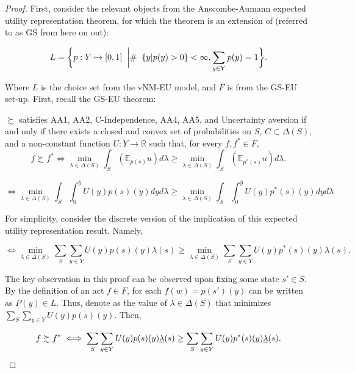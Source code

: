\documentclass[\econtexRoot/IneqMeas]{subfiles}
\begin{document}
\begin{proof}

	\par First, consider the relevant objects from the Anscombe-Aumann expected utility representation theorem, for which the \cite{gs89} theorem is an extension of (referred to as GS from here on out):
	
	$$ L = \bigg\{ p: Y \mapsto [0,1] \hspace{2mm} \bigg| \# \hspace{2mm} \{y|p(y)>0\} < \infty, \sum_{y \in Y} p(y) =1  \bigg\}. $$


	\par Where $L$ is the choice set from the vNM-EU model, and $F$ is from the GS-EU set-up. First, recall the GS-EU theorem:

\begin{tm}
$\succsim $ satisfies AA1, AA2, C-Independence, AA4, AA5, and Uncertainty aversion if and only if there exists a closed and convex set of probabilities on $S$, $C \subset \Delta(S)$, and a non-constant function $U: Y \to \mathbb{R}$ such that, for every $f, f^* \in F,$
$$ f \succsim f^* \iff \min_{\lambda \in \Delta(S)} \int_{S} (\mathbb{E}_{p(s)} u) d \lambda  \geq \min_{\lambda \in \Delta(S)} \int_{S} (\mathbb{E}_{p^{*}(s)} u) d \lambda.$$
\end{tm}

$$	\iff  \min_{\lambda \in \Delta(S)} \int_{S} \int_{0}^{\bar{y}} U(y)p(s)(y) dy d \lambda \geq  \min_{\lambda \in \Delta(S)} \int_{S} \int_{0}^{\bar{y}} U(y)p^{*}(s)(y) dy  d \lambda $$

	\par For simplicity, consider the discrete version of the implication of this expected utility representation result. Namely,

$$  \iff  \min_{\lambda \in \Delta(S)} \sum_{S} \sum_{y \in Y} U(y)p(s)(y) \lambda(s) \geq  \min_{\lambda \in \Delta(S)} \sum_{S} \sum_{y \in Y} U(y)p^{*}(s)(y) \lambda(s).   $$

	\par The key observation in this proof can be observed upon fixing some state $s' \in S$. By the definition of an act $f \in F$, for each $f(w)=p(s')(y)$ can be written as $P(y) \in L$. Thus, denote \underbar{$\lambda$} as the value of $\lambda \in \Delta(S)$ that minimizes  $\sum_{S} \sum_{y \in Y} U(y)p(s)(y)$. Then,
	
$$  f \succsim f^* \iff  \sum_{S} \sum_{y \in Y} U(y)p(s)(y) \underbar{$\lambda$}(s) \geq  \sum_{S} \sum_{y \in Y} U(y)p^{*}(s)(y) \underbar{$\lambda$}(s).   $$


\end{proof}
\end{document}
